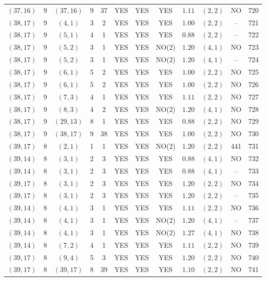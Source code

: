 \begin{longtable}{|c|c|c|c|c|c|c|c|c|c|c|c|}
$(37,16)$ & 9 & $(37,16)$ & 9 & 37 & YES & YES & YES & $1.11$ & $(2,2)$ & NO & 720\\
$(38,17)$ & 9 & $(4,1)$ & 3 & 2 & YES & YES & YES & $1.00$ & $(2,2)$ & -- & 721\\
$(38,17)$ & 9 & $(5,1)$ & 4 & 1 & YES & YES & YES & $0.88$ & $(2,2)$ & -- & 722\\
$(38,17)$ & 9 & $(5,2)$ & 3 & 1 & YES & YES & NO(2) & $1.20$ & $(4,1)$ & NO & 723\\
$(38,17)$ & 9 & $(5,2)$ & 3 & 1 & YES & YES & NO(2) & $1.20$ & $(4,1)$ & -- & 724\\
$(38,17)$ & 9 & $(6,1)$ & 5 & 2 & YES & YES & YES & $1.00$ & $(2,2)$ & NO & 725\\
$(38,17)$ & 9 & $(6,1)$ & 5 & 2 & YES & YES & YES & $1.00$ & $(2,2)$ & NO & 726\\
$(38,17)$ & 9 & $(7,3)$ & 4 & 1 & YES & YES & YES & $1.11$ & $(2,2)$ & NO & 727\\
$(38,17)$ & 9 & $(8,3)$ & 4 & 2 & YES & YES & NO(2) & $1.20$ & $(4,1)$ & NO & 728\\
$(38,17)$ & 9 & $(29,13)$ & 8 & 1 & YES & YES & YES & $0.88$ & $(2,2)$ & NO & 729\\
$(38,17)$ & 9 & $(38,17)$ & 9 & 38 & YES & YES & YES & $1.00$ & $(2,2)$ & NO & 730\\
$(39,17)$ & 8 & $(2,1)$ & 1 & 1 & YES & YES & NO(2) & $1.20$ & $(2,2)$ & 441 & 731\\
$(39,14)$ & 8 & $(3,1)$ & 2 & 3 & YES & YES & YES & $0.88$ & $(4,1)$ & NO & 732\\
$(39,14)$ & 8 & $(3,1)$ & 2 & 3 & YES & YES & YES & $0.88$ & $(4,1)$ & -- & 733\\
$(39,17)$ & 8 & $(3,1)$ & 2 & 3 & YES & YES & YES & $1.20$ & $(2,2)$ & NO & 734\\
$(39,17)$ & 8 & $(3,1)$ & 2 & 3 & YES & YES & YES & $1.20$ & $(2,2)$ & -- & 735\\
$(39,14)$ & 8 & $(4,1)$ & 3 & 1 & YES & YES & YES & $1.11$ & $(2,2)$ & NO & 736\\
$(39,14)$ & 8 & $(4,1)$ & 3 & 1 & YES & YES & NO(2) & $1.20$ & $(4,1)$ & -- & 737\\
$(39,14)$ & 8 & $(4,1)$ & 3 & 1 & YES & YES & NO(2) & $1.27$ & $(4,1)$ & NO & 738\\
$(39,14)$ & 8 & $(7,2)$ & 4 & 1 & YES & YES & YES & $1.11$ & $(2,2)$ & NO & 739\\
$(39,17)$ & 8 & $(9,4)$ & 5 & 3 & YES & YES & YES & $1.20$ & $(2,2)$ & NO & 740\\
$(39,17)$ & 8 & $(39,17)$ & 8 & 39 & YES & YES & YES & $1.10$ & $(2,2)$ & NO & 741\\

\end{longtable}
